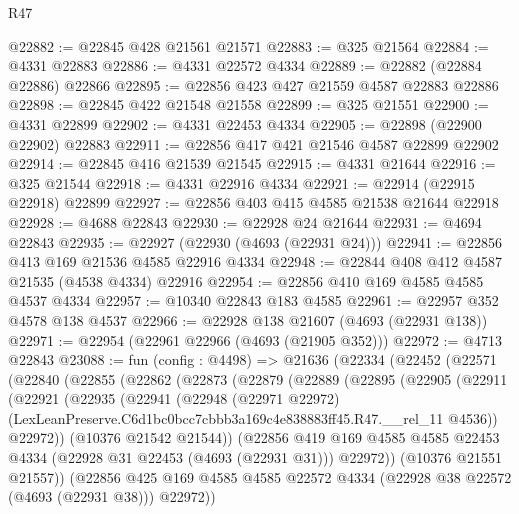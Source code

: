 \begin{lexlean}{R47}
\begin{coremodule}
@22882 := @22845 @428 @21561 @21571
@22883 := @325 @21564
@22884 := @4331 @22883
@22886 := @4331 @22572 @4334
@22889 := @22882 (@22884 @22886) @22866
@22895 := @22856 @423 @427 @21559 @4587 @22883 @22886
@22898 := @22845 @422 @21548 @21558
@22899 := @325 @21551
@22900 := @4331 @22899
@22902 := @4331 @22453 @4334
@22905 := @22898 (@22900 @22902) @22883
@22911 := @22856 @417 @421 @21546 @4587 @22899 @22902
@22914 := @22845 @416 @21539 @21545
@22915 := @4331 @21644
@22916 := @325 @21544
@22918 := @4331 @22916 @4334
@22921 := @22914 (@22915 @22918) @22899
@22927 := @22856 @403 @415 @4585 @21538 @21644 @22918
@22928 := @4688 @22843
@22930 := @22928 @24 @21644
@22931 := @4694 @22843
@22935 := @22927 (@22930 (@4693 (@22931 @24)))
@22941 := @22856 @413 @169 @21536 @4585 @22916 @4334
@22948 := @22844 @408 @412 @4587 @21535 (@4538 @4334) @22916
@22954 := @22856 @410 @169 @4585 @4585 @4537 @4334
@22957 := @10340 @22843 @183 @4585
@22961 := @22957 @352 @4578 @138 @4537
@22966 := @22928 @138 @21607 (@4693 (@22931 @138))
@22971 := @22954 (@22961 @22966 (@4693 (@21905 @352)))
@22972 := @4713 @22843
@23088 := fun (config : @4498) =>
  @21636
    (@22334
      (@22452
        (@22571
          (@22840
            (@22855
              (@22862
                (@22873
                  (@22879
                    (@22889
                      (@22895
                        (@22905
                          (@22911
                            (@22921
                              (@22935
                                (@22941
                                  (@22948
                                    (@22971 @22972)
                                    (LexLeanPreserve.C6d1bc0bcc7cbbb3a169c4e838883ff45.R47.__rel_11
                                      @4536))
                                  @22972))
                              (@10376 @21542 @21544))
                            (@22856
                              @419
                              @169
                              @4585
                              @4585
                              @22453
                              @4334
                              (@22928 @31 @22453 (@4693 (@22931 @31)))
                              @22972))
                          (@10376 @21551 @21557))
                        (@22856
                          @425
                          @169
                          @4585
                          @4585
                          @22572
                          @4334
                          (@22928 @38 @22572 (@4693 (@22931 @38)))
                          @22972))

\end{coremodule}
\end{lexlean}

